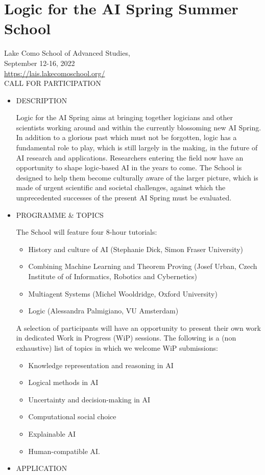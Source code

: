\documentclass[prodmode,acmtecs]{acmsmall} %
\begin{document}
\begin{itemize}
\end{itemize}\section{Logic for the AI Spring Summer School}\label{LogicfortheAISpringSummerSchool}  Lake Como School of Advanced Studies,\\ 
  September 12-16, 2022\\ 
  \href{https://lais.lakecomoschool.org/}{https://lais.lakecomoschool.org/}\\ 
CALL FOR PARTICIPATION 

\begin{itemize}\item  DESCRIPTION 
 
  Logic for the AI Spring aims at bringing together logicians and other scientists working around and within the currently blossoming new AI Spring. In addition to a glorious past which must not be forgotten, logic has a fundamental role to play, which is still largely in the making, in the future of AI research and applications. Researchers entering the field now have an opportunity to shape logic-based AI in the years to come. The School is designed to help them become culturally aware of the larger picture, which is made of urgent scientific and societal challenges, against which the unprecedented successes of the present AI Spring must be evaluated. 
 
\item  PROGRAMME \& TOPICS 
 
  The School will feature four 8-hour tutorials: 
 
\begin{itemize}\item  History and culture of AI (Stephanie Dick, Simon Fraser University)
\item  Combining Machine Learning and Theorem Proving (Josef Urban, Czech Institute of of Informatics, Robotics and Cybernetics)
\item  Multiagent Systems (Michel Wooldridge, Oxford University)
\item  Logic (Alessandra Palmigiano, VU Amsterdam)
\end{itemize} 
  A selection of participants will have an opportunity to present their own work in dedicated Work in Progress (WiP) sessions. The following is a (non exhaustive) list of topics in which we welcome WiP submissions: 
 
\begin{itemize}\item  Knowledge representation and reasoning in AI
\item  Logical methods in AI
\item  Uncertainty and decision-making in AI
\item  Computational social choice
\item  Explainable AI
\item  Human-compatible AI.
\end{itemize} 
\item  APPLICATION 
 

\end{itemize}
\end{document}
